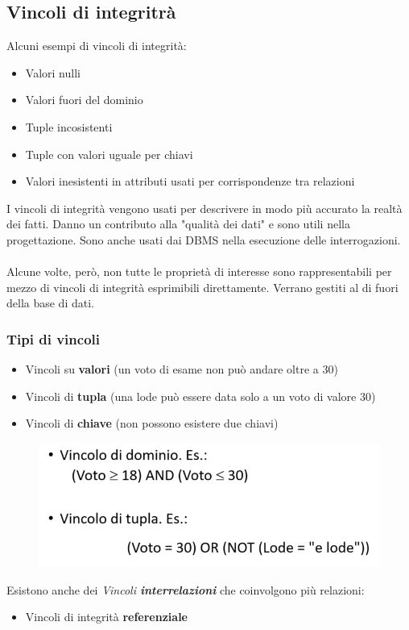 \documentclass[12pt, a4paper]{article}
\begin{document}
    \subsection{Vincoli di integritrà}
    Alcuni esempi di vincoli di integrità:
    \begin{itemize}
        \item Valori nulli
        \item Valori fuori del dominio
        \item Tuple incosistenti 
        \item Tuple con valori uguale per chiavi
        \item Valori inesistenti in attributi usati per corrispondenze tra relazioni
    \end{itemize}
    I vincoli di integrità vengono usati per descrivere in modo più accurato la realtà dei fatti.
    Danno un contributo alla "qualità dei dati" e sono utili nella progettazione. 
    Sono anche usati dai DBMS nella esecuzione delle interrogazioni.
    \\\\Alcune volte, però, non tutte le proprietà di interesse sono rappresentabili per mezzo di vincoli 
    di integrità esprimibili direttamente. Verrano gestiti al di fuori della base di dati. 
    \newpage
    \subsubsection*{Tipi di vincoli}
    \begin{itemize}
        \item Vincoli su \textbf{valori} (un voto di esame non può andare oltre a 30)
        \item Vincoli di \textbf{tupla} (una lode può essere data solo a un voto di valore 30)
        \item Vincoli di \textbf{chiave} (non possono esistere due chiavi)
    \end{itemize}
    \begin{figure}[htbp]
        \centering
        \includegraphics[scale=0.5]{vincoli.png}
        
    \end{figure}

    Esistono anche dei \textit{Vincoli \textbf{interrelazioni}} che coinvolgono più relazioni:
    \begin{itemize}
        \item Vincoli di integrità \textbf{referenziale}
    \end{itemize}

    
\end{document}
